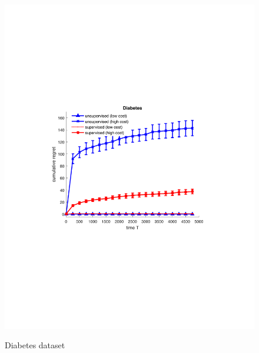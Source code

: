 \begin{figure}[!bt]
\begin{minipage}{4cm}
		\includegraphics[scale=0.3]{../Simulations/Figures/Diabetes_WD1}
		\label{fig:Diabetes}
		\vspace{-.5cm}
		\caption{Diabetes dataset}
	\end{minipage}
	\begin{minipage}{4cm}
		\centering

\end{minipage}
\end{figure}

